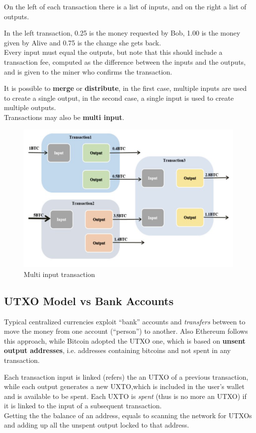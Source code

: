 On the left of each transaction there is a list of inputs, and on the right a list of outputs. 

In the left transaction, 0.25 is the money requested by Bob, 1.00 is the money given by Alive and 0.75 is the change she gets back.\\
Every input must equal the outputs, but note that this should include a transaction fee, computed as the difference between the inputs and the outputs, and is given to the miner who confirms the transaction.

It is possible to \textbf{merge} or \textbf{distribute}, in the first case, multiple inputs are used to create a single output, in the second case, a single input is used to create multiple outputs.\\
Transactions may also be \textbf{multi input}.

\begin{figure}[htbp]
   \centering
   \includegraphics{images/bitcoin_multiinput.png}
   \caption{Multi input transaction}
   \label{fig:bitcoin_multiinput}
\end{figure}

\subsection{UTXO Model vs Bank Accounts}
Typical centralized currencies exploit ``bank'' accounts and \textit{transfers} between to move the money from one account (``person'') to another.
Also Ethereum follows this approach, while Bitcoin adopted the UTXO one, which is based on \textbf{unsent output addresses}, i.e. addresses containing bitcoins and not spent in any
transaction.

Each transaction input is linked (refers) the an UTXO of
a previous transaction, while each output generates a new UXTO,which is included in the user’s wallet and is available to be spent.
Each UXTO is \textit{spent} (thus is no more an UTXO) if it is linked to the input of a subsequent transaction.\\
Getting the the balance of an address, equals to scanning the network for UTXOs and adding up all the unspent output locked to that address.

